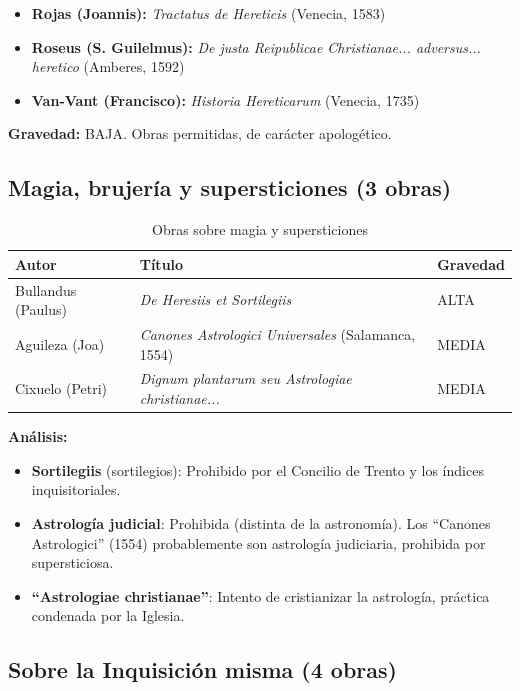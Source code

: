 \documentclass[12pt,a4paper]{article}
\begin{document}
\begin{itemize}
    \item \textbf{Rojas (Joannis):} \textit{Tractatus de Hereticis} (Venecia, 1583)
    \item \textbf{Roseus (S. Guilelmus):} \textit{De justa Reipublicae Christianae... adversus... heretico} (Amberes, 1592)
    \item \textbf{Van-Vant (Francisco):} \textit{Historia Hereticarum} (Venecia, 1735)
\end{itemize}

\textbf{Gravedad:} BAJA. Obras permitidas, de carácter apologético.

\subsection{Magia, brujería y supersticiones (3 obras)}

\begin{table}[h]
\centering
\caption{Obras sobre magia y supersticiones}
\begin{tabular}{p{6cm}p{4cm}p{2cm}}
\toprule
\textbf{Autor} & \textbf{Título} & \textbf{Gravedad} \\
\midrule
Bullandus (Paulus) & \textit{De Heresiis et Sortilegiis} & ALTA \\
Aguileza (Joa) & \textit{Canones Astrologici Universales} (Salamanca, 1554) & MEDIA \\
Cixuelo (Petri) & \textit{Dignum plantarum seu Astrologiae christianae...} & MEDIA \\
\bottomrule
\end{tabular}
\end{table}

\textbf{Análisis:}

\begin{itemize}
    \item \textbf{Sortilegiis} (sortilegios): Prohibido por el Concilio de Trento y los índices inquisitoriales.
    \item \textbf{Astrología judicial}: Prohibida (distinta de la astronomía). Los ``Canones Astrologici'' (1554) probablemente son astrología judiciaria, prohibida por supersticiosa.
    \item \textbf{``Astrologiae christianae''}: Intento de cristianizar la astrología, práctica condenada por la Iglesia.
\end{itemize}

\subsection{Sobre la Inquisición misma (4 obras)}
\end{document}

